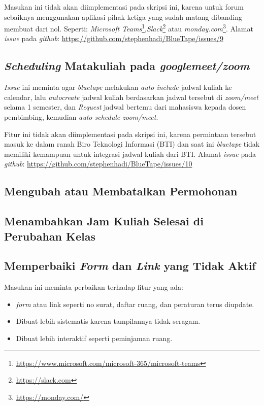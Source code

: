 Masukan ini tidak akan diimplementasi pada skripsi ini, karena untuk forum sebaiknya menggunakan aplikasi pihak ketiga yang sudah matang dibanding membuat dari nol. Seperti: \textit{Microsoft Teams}\footnote{\url{https://www.microsoft.com/microsoft-365/microsoft-teams}},\textit{Slack}\footnote{\url{https://slack.com}} atau \textit{monday.com}\footnote{\url{https://monday.com/}}. Alamat \textit{issue} pada \textit{github}: \url{https://github.com/stephenhadi/BlueTape/issues/9} 

\subsection{\textit{Scheduling} Matakuliah pada \textit{googlemeet/zoom}}
\label{issue:10}
\textit{Issue} ini meminta agar \textit{bluetape} melakukan \textit{auto include} jadwal kuliah ke calendar, lalu \textit{autocreate} jadwal kuliah berdasarkan jadwal tersebut di \textit{zoom/meet} selama 1 semester, dan \textit{Request} jadwal bertemu dari mahasiswa kepada dosen pembimbing, kemudian \textit{auto schedule zoom/meet}.

Fitur ini tidak akan diimplementasi pada skripsi ini, karena permintaan tersebut masuk ke dalam ranah Biro Teknologi Informasi (BTI) dan saat ini \textit{bluetape} tidak memiliki kemampuan untuk integrasi jadwal kuliah dari BTI. Alamat \textit{issue} pada \textit{github}: \url{https://github.com/stephenhadi/BlueTape/issues/10} 

\subsection{Mengubah atau Membatalkan Permohonan}
\label{issue:11}
\subsection{Menambahkan Jam Kuliah Selesai di Perubahan Kelas}
\label{issue:12}

\subsection{Memperbaiki \textit{Form} dan \textit{Link} yang Tidak Aktif}
\label{issue:13}
Masukan ini meminta perbaikan terhadap fitur yang ada: 
\begin{itemize}
	\item \textit{form} atau link seperti no surat, daftar ruang, dan peraturan terus diupdate.
	\item Dibuat lebih sistematis karena tampilannya tidak seragam.
	\item Dibuat lebih interaktif seperti peminjaman ruang.
\end{itemize}   

